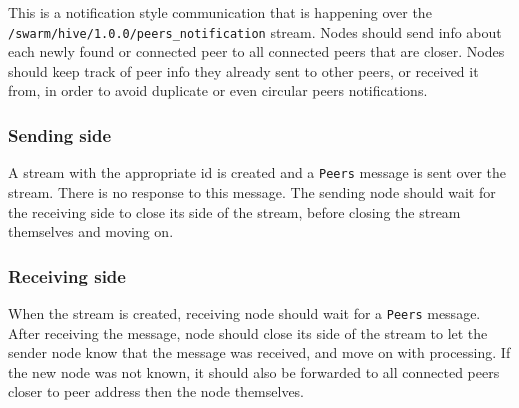 This is a notification style communication that is happening over the\\ \lstinline{/swarm/hive/1.0.0/peers_notification} stream. Nodes should send info about each newly found or connected peer to all connected peers that are closer. Nodes should keep track of peer info they already sent to other peers, or received it from, in order to avoid  duplicate or even circular peers notifications.

\subsubsection{Sending side}

A stream with the appropriate id is created and a \lstinline{Peers} message is sent over the stream. There is no response to this message. The sending node should wait for the receiving side to close its side of the stream, before closing the stream themselves and moving on.

\subsubsection{Receiving side}

When the stream is created, receiving node should wait for a \lstinline{Peers} message. After receiving the message, node should close its side of the stream to let the sender node know that the message was received, and move on with processing. If the new node was not known, it should also be forwarded to all connected peers closer to peer address then the node themselves.



